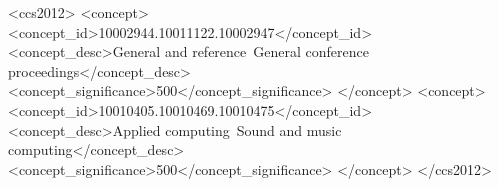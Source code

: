 \begin{CCSXML}
<ccs2012>
<concept>
<concept_id>10002944.10011122.10002947</concept_id>
<concept_desc>General and reference~General conference proceedings</concept_desc>
<concept_significance>500</concept_significance>
</concept>
<concept>
<concept_id>10010405.10010469.10010475</concept_id>
<concept_desc>Applied computing~Sound and music computing</concept_desc>
<concept_significance>500</concept_significance>
</concept>
</ccs2012>
\end{CCSXML}